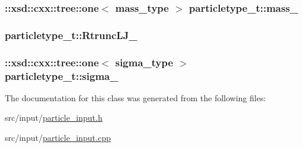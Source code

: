 \subsubsection[{\texorpdfstring{mass\+\_\+}{mass_}}]{\setlength{\rightskip}{0pt plus 5cm}\+::xsd\+::cxx\+::tree\+::one$<$ {\bf mass\+\_\+type} $>$ particletype\+\_\+t\+::mass\+\_\+\hspace{0.3cm}{\ttfamily [protected]}}\hypertarget{classparticletype__t_a833425b7549845017f4f53201e261c76}{}\label{classparticletype__t_a833425b7549845017f4f53201e261c76}
\subsubsection[{\texorpdfstring{Rtrunc\+L\+J\+\_\+}{RtruncLJ_}}]{ particletype\+\_\+t\+::\+Rtrunc\+L\+J\+\_\+\hspace{0.3cm}{\ttfamily [protected]}}\hypertarget{classparticletype__t_ae0011fe9477c7239e4e270378ea1ddbc}{}\label{classparticletype__t_ae0011fe9477c7239e4e270378ea1ddbc}
\subsubsection[{\texorpdfstring{sigma\+\_\+}{sigma_}}]{\setlength{\rightskip}{0pt plus 5cm}\+::xsd\+::cxx\+::tree\+::one$<$ {\bf sigma\+\_\+type} $>$ particletype\+\_\+t\+::sigma\+\_\+\hspace{0.3cm}{\ttfamily [protected]}}\hypertarget{classparticletype__t_a1d31f582a032e178f3e0832a7202fa68}{}\label{classparticletype__t_a1d31f582a032e178f3e0832a7202fa68}


The documentation for this class was generated from the following files\+:\begin{DoxyCompactItemize}
\item 
src/input/\hyperlink{particle__input_8h}{particle\+\_\+input.\+h}\item 
src/input/\hyperlink{particle__input_8cpp}{particle\+\_\+input.\+cpp}\end{DoxyCompactItemize}
